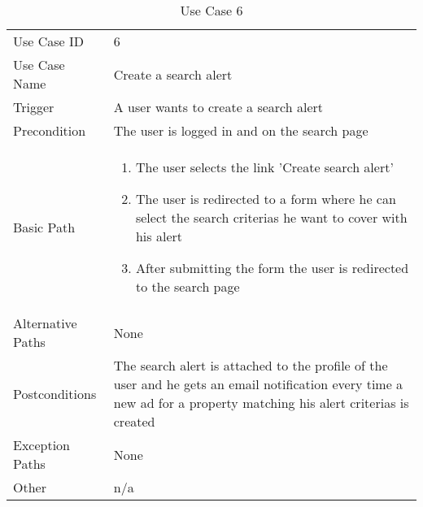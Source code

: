 \begin{table}[H]
\centering
\label{table-use-case-6}
\begin{tabular}{|p{3cm}|p{10cm}}
Use Case ID       & 6                                                         \\
Use Case Name     & Create a search alert                                                         \\
Trigger           & A user wants to create a search alert                                         \\
Precondition      & The user is logged in and on the search page                          \\
Basic Path        & \begin{enumerate}
\item The user selects the link 'Create search alert'
\item The user is redirected to a form where he can select the search criterias
he want to cover with his alert
\item After submitting the form the user is redirected to the search page 
\end{enumerate} 
     \\
Alternative Paths & None                          \\
Postconditions    & The search alert is attached to the profile of the user and
he gets an email notification every time a new ad for a property matching his
alert criterias is created			\\
Exception Paths   & None				\\
Other             & n/a                                                                                                                                                                                                        
\end{tabular}
\caption{Use Case 6}
\end{table}

